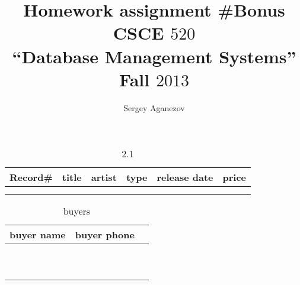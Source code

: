 \documentclass[]{article}
\author{Sergey Aganezov}
\title{Homework assignment \#Bonus \\ CSCE $520$ \\ ``Database Management Systems'' \\ Fall $2013$}
\date{}
\begin{document}
	\setcounter{page}{15}
	\setcounter{table}{9}
		\begin{center}
			\begin{longtable}{|c|c|c|c|c|c|}
			\caption{2.1} \\ 
			\hline
			\hline
			Record\# & title & artist & type & release date & price \\ 
			\hline
				\phantom{1} & & & & &  \\
			\hline
				\phantom{1} & & & & &  \\
			\hline
			\hline
			\end{longtable}
		\end{center}

		\begin{center}
			\begin{longtable}{|c|c|c|}
			\caption{buyers} \\ 
			\hline
			\hline
			buyer name & buyer phone  \\ 
			\hline
				\phantom{1} &   \\
			\hline
				\phantom{1} &  \\
			\hline
			\phantom{1} &  \\
			\hline
				\phantom{1} &  \\
			\hline
			\phantom{1} &  \\
			\hline
				\phantom{1} &  \\
			\hline
			\phantom{1} &  \\
			\hline
				\phantom{1} &   \\
			\hline
			\phantom{1} &  \\
			\hline
				\phantom{1} &  \\
			\hline
			\hline
			\end{longtable}
		\end{center}
\end{document}
